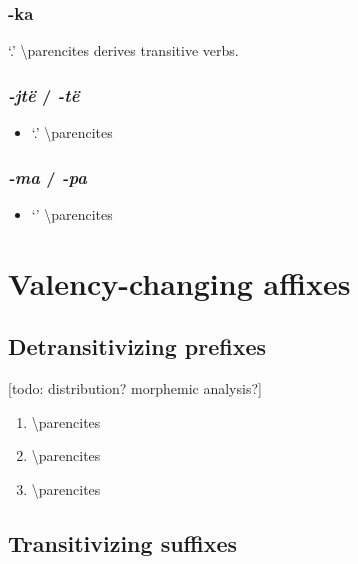 \documentclass{memoir}
\begin{document}
\subsubsection{\texorpdfstring{-ka \label{sec:kavbz}}{-ka }}

 `.' \textbackslash parencites derives
transitive verbs.

\subsubsection{\texorpdfstring{\emph{-jtë} / \emph{-të}
\label{sec:jtevbz}}{-jtë / -të }}

\begin{itemize}
\tightlist
\item
   `.' \textbackslash parencites
\end{itemize}

\subsubsection{\texorpdfstring{\emph{-ma} / \emph{-pa}
\label{sec:macaus}}{-ma / -pa }}

\begin{itemize}
\tightlist
\item
   `' \textbackslash parencites
\end{itemize}

\section{Valency-changing affixes}

\subsection{\texorpdfstring{Detransitivizing prefixes
\label{sec:detrz}}{Detransitivizing prefixes }}

{[}todo: distribution? morphemic analysis?{]}

\begin{enumerate}
\def\labelenumi{\arabic{enumi}.}
\tightlist
\item
   \textbackslash parencites
\item
   \textbackslash parencites
\item
   \textbackslash parencites
\end{enumerate}

\subsection{Transitivizing suffixes}
\end{document}
